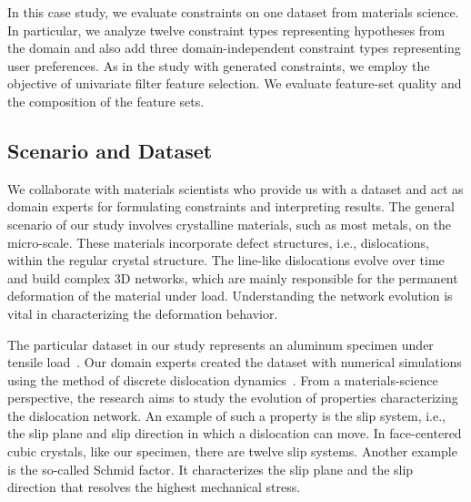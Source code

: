 In this case study, we evaluate constraints on one dataset from materials science.
In particular, we analyze twelve constraint types representing hypotheses from the domain and also add three domain-independent constraint types representing user preferences.
As in the study with generated constraints, we employ the objective of univariate filter feature selection.
We evaluate feature-set quality and the composition of the feature sets.

\subsection{Scenario and Dataset}
\label{sec:ms:experimental-design:scenario}

We collaborate with materials scientists who provide us with a dataset and act as domain experts for formulating constraints and interpreting results.
The general scenario of our study involves crystalline materials, such as most metals, on the micro-scale.
These materials incorporate defect structures, i.e., dislocations, within the regular crystal structure.
The line-like dislocations evolve over time and build complex 3D networks, which are mainly responsible for the permanent deformation of the material under load.
Understanding the network evolution is vital in characterizing the deformation behavior. 

The particular dataset in our study represents an aluminum specimen under tensile load~\cite{sudmanns2020data}.
Our domain experts created the dataset with numerical simulations using the method of discrete dislocation dynamics~\cite{weygand2001discrete}.
From a materials-science perspective, the research aims to study the evolution of properties characterizing the dislocation network.
An example of such a property is the slip system, i.e., the slip plane and slip direction in which a dislocation can move.
In face-centered cubic crystals, like our specimen, there are twelve slip systems.
Another example is the so-called Schmid factor.
It characterizes the slip plane and the slip direction that resolves the highest mechanical stress. 

